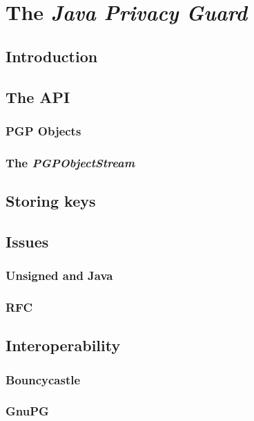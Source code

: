 \chapter{The \textit{Java Privacy Guard}}

\section{Introduction}


\section{The API}

\subsection{PGP Objects}

\subsection{The \textit{PGPObjectStream}}


\section{Storing keys}


\section{Issues}

\subsection{Unsigned and Java}

\subsection{RFC}


\section{Interoperability}

\subsection{Bouncycastle}

\subsection{GnuPG}


